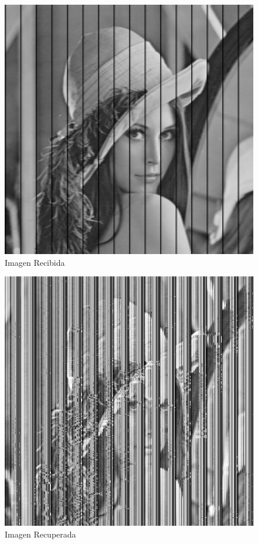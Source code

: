 \documentclass{article}
\begin{document}
\begin{multicols}{2}
\begin{figure}[H]
\centering
\includegraphics[scale=0.2]{../img/received_part3b.png}
\caption{Imagen Recibida}

\end{figure}

\begin{figure}[H]
\centering
\includegraphics[scale=0.2]{../img/corrected_part3b.png}
\caption{Imagen Recuperada}


\end{figure}
\end{multicols}
\end{document}
